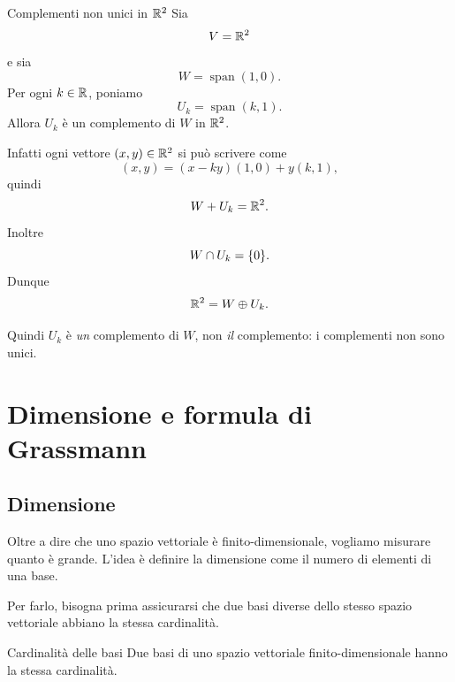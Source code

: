 \documentclass[a4paper]{article}
\begin{document}
\begin{snippetexample}{Complementi non unici in \(\mathbb{R}^2\)}
    Sia
    \[
        V=\mathbb{R}^2
    \]
    e sia
    \[
        W=\operatorname{span}(1,0).
    \]
    Per ogni \(k\in\mathbb{R}\), poniamo
    \[
        U_k=\operatorname{span}(k,1).
    \]
    Allora \(U_k\) è un complemento di \(W\) in \(\mathbb{R}^2\).

    Infatti ogni vettore \((x,y)\in\mathbb{R}^2\) si può scrivere come
    \[
        (x,y)=(x-ky)(1,0)+y(k,1),
    \]
    quindi
    \[
        W+U_k=\mathbb{R}^2.
    \]
    Inoltre
    \[
        W\cap U_k=\{0\}.
    \]
    Dunque
    \[
        \mathbb{R}^2=W\oplus U_k.
    \]

    \begin{center}
    \end{center}

    Quindi \(U_k\) è \emph{un} complemento di \(W\), non \emph{il} complemento: i complementi non sono unici.
\end{snippetexample}

\section{Dimensione e formula di Grassmann}

\subsection{Dimensione}

Oltre a dire che uno spazio vettoriale è finito-dimensionale, vogliamo misurare quanto è grande. L'idea è definire la dimensione come il numero di elementi di una base.

Per farlo, bisogna prima assicurarsi che due basi diverse dello stesso spazio vettoriale abbiano la stessa cardinalità.

\begin{snippetproposition}{Cardinalità delle basi}
    Due basi di uno spazio vettoriale finito-dimensionale hanno la stessa cardinalità.
\end{snippetproposition}
\end{document}
